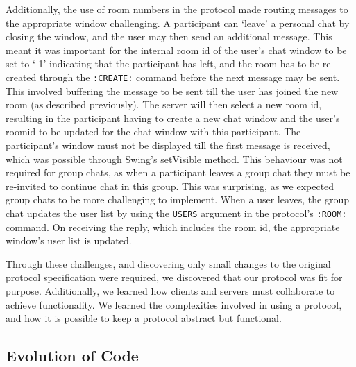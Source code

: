 Additionally, the use of room numbers in the protocol made routing messages to the appropriate window challenging. A participant can `leave' a personal chat by closing the window, and the user may then send an additional message. This meant it was important for the internal room id of the user's chat window to be set to `-1' indicating that the participant has left, and the room has to be re-created through the \texttt{:CREATE:} command before the next message may be sent. This involved buffering the message to be sent till the user has joined the new room (as described previously). The server will then select a new room id, resulting in the participant having to create a new chat window and the user's roomid to be updated for the chat window with this participant. The participant's window must not be displayed till the first message is received, which was possible through Swing's setVisible method. This behaviour was not required for group chats, as when a participant leaves a group chat they must be re-invited to continue chat in this group. This was surprising, as we expected group chats to be more challenging to implement. When a user leaves, the group chat updates the user list by using the \texttt{USERS} argument in the protocol's \texttt{:ROOM:} command. On receiving the reply, which includes the room id, the appropriate window's user list is updated.

Through these challenges, and discovering only small changes to the original protocol specification were required, we discovered that our protocol was fit for purpose. Additionally, we learned how clients and servers must collaborate to achieve functionality. We learned the complexities involved in using a protocol, and how it is possible to keep a protocol abstract but functional.

\subsection{Evolution of Code}
\label{code_evol}

